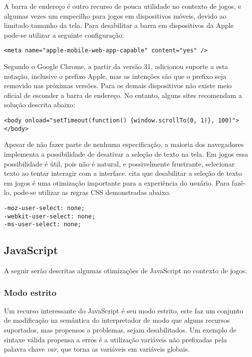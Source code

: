 A barra de endereço é outro recurso de pouca utilidade no contexto
de jogos, e algumas vezes um empecilho para jogos em dispositivos
móveis, devido ao limitado tamanho da tela. Para desabilitar a barra em
dispositivos da Apple pode-se utilizar a seguinte configuração:

\begin{verbatim}
<meta name="apple-mobile-web-app-capable" content="yes" />
\end{verbatim}

Segundo \citet{homescreenwebapps} o Google Chrome, a partir da versão
31, adicionou suporte a esta notação, inclusive o prefixo Apple, mas
as intenções são que o prefixo seja removido nas próximas versões.
Para os demais dispositivos não existe meio oficial de esconder a
barra de endereço. No entanto, alguns sites recomendam a solução
descrita abaixo:

\begin{verbatim}
<body onload="setTimeout(function() {window.scrollTo(0, 1)}, 100)">
</body>
\end{verbatim}

Apesar de não fazer parte de nenhuma especificação, a maioria dos
navegadores implementa a possibilidade de desativar a seleção de texto
na tela. Em jogos essa possibilidade é útil, pois não é natural, e
possivelmente frustrante, selecionar texto ao tentar interagir com a
interface. \citet{html5mostwanted} cita que desabilitar a seleção de
texto em jogos é uma otimização importante para a experiência do
usuário. Para fazê-lo, pode-se utilizar as regras CSS demonstradas
abaixo.

\begin{verbatim}
-moz-user-select: none;
-webkit-user-select: none;
-ms-user-select: none;
\end{verbatim}

\subsection{JavaScript}

A seguir serão descritas algumas otimizações de JavaScript no
contexto de jogos.

\subsubsection{Modo estrito}

Um recurso interessante do JavaScript é seu modo estrito, este faz
um conjunto de modificação na semântica do interpretador de modo
que alguns recursos suportados, mas propensos a problemas, sejam
desabilitados. Um exemplo de sintaxe válida propensa a erros é a
utilização variáveis não prefixadas pela palavra chave \textit{var},
que torna as variáveis em variáveis globais.

